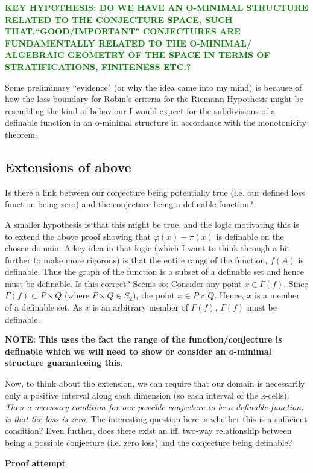 \begin{definition}
\textcolor{green}{\textbf{KEY HYPOTHESIS: DO WE HAVE AN O-MINIMAL STRUCTURE RELATED TO THE CONJECTURE SPACE, SUCH THAT,``GOOD/IMPORTANT" CONJECTURES 
ARE FUNDAMENTALLY RELATED TO THE O-MINIMAL/ ALGEBRAIC GEOMETRY OF THE SPACE IN TERMS OF STRATIFICATIONS, FINITENESS ETC.?}
}

Some preliminary ``evidence" (or why the idea came into my mind) is because of how the loss boundary for Robin's criteria for the Riemann Hypothesis might be resembling the kind of behaviour I would expect for the subdivisions of a definable function in an o-minimal structure in accordance with the monotonicity theorem.

\subsection{Extensions of above}
Is there a link between our conjecture being potentially true (i.e. our defined loss function being zero) and the conjecture being a definable function?
\par A smaller hypothesis is that this might be true, and the logic motivating this is to extend the above proof showing that $\varphi(x) - \pi(x)$ is definable on the chosen domain. A key idea in that logic (which I want to think through a bit further to make more rigorous) is that the entire range of the function, $f(A)$ is definable. Thus the graph of the function is a subset of a definable set and hence must be definable. Is this correct? Seems so: Consider any point $x\in\Gamma(f)$. Since $\Gamma(f)\subset P\times Q$ (where $P\times Q\in S_2$), the point $x\in P\times Q$. Hence, $x$ is a member of a definable set. As $x$ is an arbitrary member of $\Gamma(f)$, $\Gamma(f)$ must be definable.

\textbf{NOTE: This uses the fact the range of the function/conjecture is definable which we will need to show or consider an o-minimal structure guaranteeing this.}

Now, to think about the extension, we can require that our domain is necessarily only a positive interval along each dimension (so each interval of the k-cells). \textit{Then a necessary condition for our possible conjecture to be a definable function, is that the loss is zero.} The interesting question here is whether this is a sufficient condition? Even further, does there exist an iff, two-way relationship between being a possible conjecture (i.e. zero loss) and the conjecture being definable?

\textbf{Proof attempt}


\end{definition}

